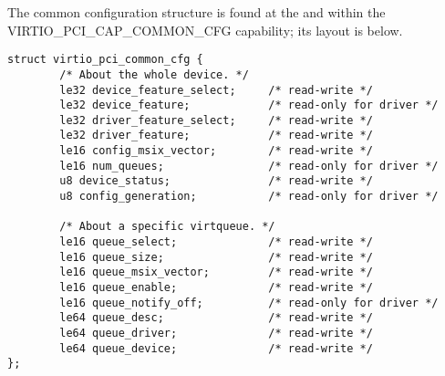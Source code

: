 The common configuration structure is found at the  and  within the VIRTIO_PCI_CAP_COMMON_CFG capability; its layout is below.

\begin{lstlisting}
struct virtio_pci_common_cfg {
        /* About the whole device. */
        le32 device_feature_select;     /* read-write */
        le32 device_feature;            /* read-only for driver */
        le32 driver_feature_select;     /* read-write */
        le32 driver_feature;            /* read-write */
        le16 config_msix_vector;        /* read-write */
        le16 num_queues;                /* read-only for driver */
        u8 device_status;               /* read-write */
        u8 config_generation;           /* read-only for driver */

        /* About a specific virtqueue. */
        le16 queue_select;              /* read-write */
        le16 queue_size;                /* read-write */
        le16 queue_msix_vector;         /* read-write */
        le16 queue_enable;              /* read-write */
        le16 queue_notify_off;          /* read-only for driver */
        le64 queue_desc;                /* read-write */
        le64 queue_driver;              /* read-write */
        le64 queue_device;              /* read-write */
};
\end{lstlisting}

